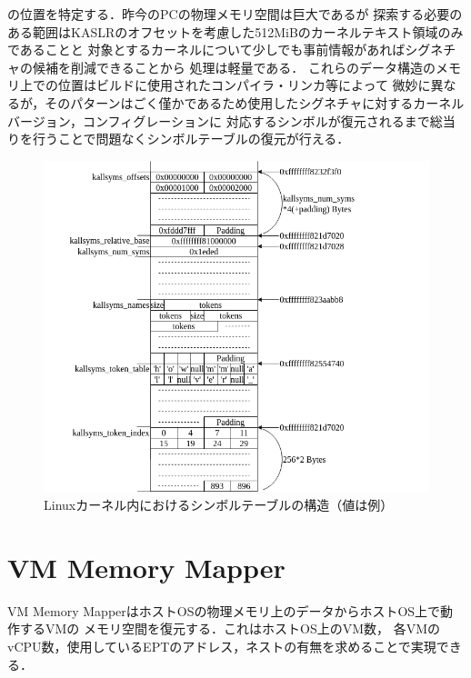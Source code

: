 の位置を特定する．昨今のPCの物理メモリ空間は巨大であるが
探索する必要のある範囲はKASLRのオフセットを考慮した512MiBのカーネルテキスト領域のみであることと
対象とするカーネルについて少しでも事前情報があればシグネチャの候補を削減できることから
処理は軽量である．
これらのデータ構造のメモリ上での位置はビルドに使用されたコンパイラ・リンカ等によって
微妙に異なるが，そのパターンはごく僅かであるため使用したシグネチャに対するカーネルバージョン，コンフィグレーションに
対応するシンボルが復元されるまで総当りを行うことで問題なくシンボルテーブルの復元が行える．


\begin{figure}[h]
  \includegraphics[scale=0.45]{kallsyms.png}
  \caption{Linuxカーネル内におけるシンボルテーブルの構造（値は例）}
  \label{fig:kallsyms}
\end{figure}

\section{VM Memory Mapper}

VM Memory MapperはホストOSの物理メモリ上のデータからホストOS上で動作するVMの
メモリ空間を復元する．これはホストOS上のVM数，
各VMのvCPU数，使用しているEPTのアドレス，ネストの有無を求めることで実現できる．

